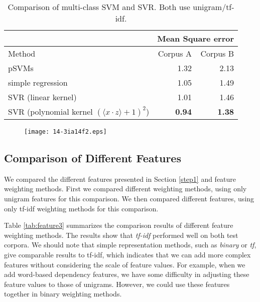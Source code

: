 \documentclass[japanese]{jnlp_1.3d}
\begin{document}
\begin{table}[b]
	\caption{Comparison of multi-class SVM and SVR. Both use unigram/tf-idf.}
	\label{hikaku}
	  \begin{center}
  \begin{tabular}{|l|rr|} \hline
                    & \multicolumn{2}{|c|}{Mean Square error}\\ \hline
  Method           & Corpus A & Corpus B \\ \hline
  pSVMs              & 1.32     & 2.13     \\
  simple regression & 1.05 & 1.49 \\
  SVR (linear kernel) & 1.01 & 1.46 \\
  SVR (polynomial kernel $(\langle x \cdot z \rangle + 1)^2$)      & \textbf{0.94}     & \textbf{1.38}     \\ \hline

  \end{tabular}
  \end{center}
\end{table}


\begin{figure}[t]
\begin{center}
    \texttt{[image: 14-3ia14f2.eps]}
\label{fig:hresult}
\end{center}
\end{figure}



\subsection{Comparison of Different Features}
We compared the different features presented in Section \ref{step1} and feature weighting methods. First we compared different weighting methods, using only unigram features for this comparison. We then compared different features, using only tf-idf weighting methods for this comparison. 

Table \ref{tab:feature3} summarizes the comparison results of different feature weighting methods. The results show that \textit{tf-idf} performed well on both test corpora. We should note that simple representation methods, such as \textit{binary} or \textit{tf}, give comparable results to tf-idf, which indicates that we can add more complex features without considering the scale of feature values. For example, when we add word-based dependency features, we have some difficulty in adjusting these feature values to those of unigrams. However, we could use these features together in binary weighting methods.
\end{document}
